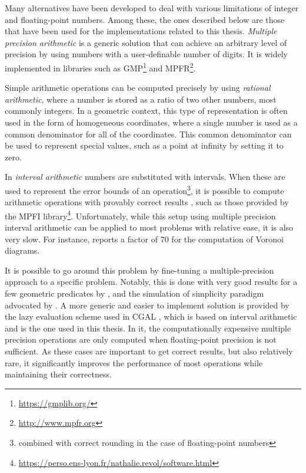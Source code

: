 Many alternatives have been developed to deal with various limitations of integer and floating-point numbers.
Among these, the ones described below are those that have been used for the implementations related to this thesis.
\emph{Multiple precision arithmetic} is a generic solution that can achieve an arbitrary level of precision by using numbers with a user-definable number of digits.
It is widely implemented in libraries such as GMP\footnote{\url{https://gmplib.org/}} and MPFR\footnote{\url{http://www.mpfr.org}}.

Simple arithmetic operations can be computed precisely by using \emph{rational arithmetic}, where a number is stored as a ratio of two other numbers, most commonly integers.
In a geometric context, this type of representation is often used in the form of homogeneous coordinates, where a single number is used as a common denominator for all of the coordinates.
This common denominator can be used to represent special values, such as a point at infinity by setting it to zero.

In \emph{interval arithmetic} numbers are substituted with intervals.
When these are used to represent the error bounds of an operation\footnote{combined with correct rounding in the case of floating-point numbers}, it is possible to compute arithmetic operations with provably correct results \citep[Ch.~2]{Ratschek88}, such as those provided by the MPFI library\footnote{\url{https://perso.ens-lyon.fr/nathalie.revol/software.html}}.
Unfortunately, while this setup using multiple precision interval arithmetic can be applied to most problems with relative ease, it is also very slow.
For instance, \citet{Held11} reports a factor of 70 for the computation of Voronoi diagrams.

It is possible to go around this problem by fine-tuning a multiple-precision approach to a specific problem.
Notably, this is done with very good results for a few geometric predicates by \citet{Shewchuk97}, and the simulation of simplicity paradigm advocated by \citep{Edelsbrunner90}.
A more generic and easier to implement solution is provided by the lazy evaluation scheme used in CGAL \citep{Pion11}, which is based on interval arithmetic and is the one used in this thesis.
In it, the computationally expensive multiple precision operations are only computed when floating-point precision is not sufficient.
As these cases are important to get correct results, but also relatively rare, it significantly improves the performance of most operations while maintaining their correctness.

